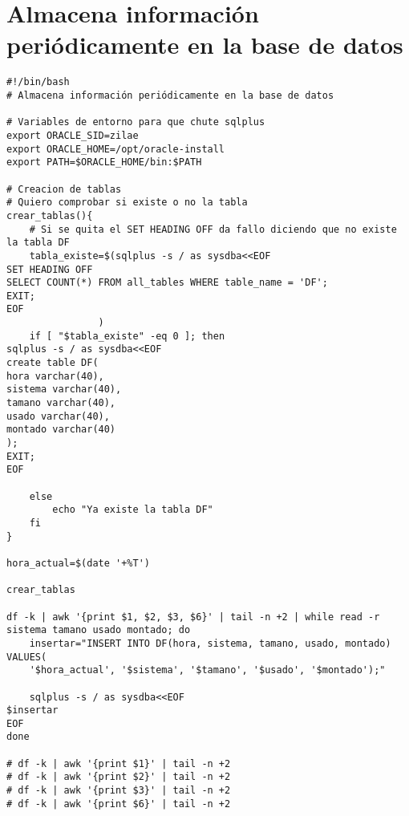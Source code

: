 \documentclass[11pt]{article}
\begin{document}
\section{Almacena información periódicamente en la base de datos}
\label{sec:org9d9271a}
\begin{verbatim}
#!/bin/bash
# Almacena información periódicamente en la base de datos

# Variables de entorno para que chute sqlplus
export ORACLE_SID=zilae
export ORACLE_HOME=/opt/oracle-install
export PATH=$ORACLE_HOME/bin:$PATH

# Creacion de tablas
# Quiero comprobar si existe o no la tabla
crear_tablas(){
    # Si se quita el SET HEADING OFF da fallo diciendo que no existe la tabla DF
    tabla_existe=$(sqlplus -s / as sysdba<<EOF
SET HEADING OFF
SELECT COUNT(*) FROM all_tables WHERE table_name = 'DF';
EXIT;
EOF
                )
    if [ "$tabla_existe" -eq 0 ]; then
sqlplus -s / as sysdba<<EOF
create table DF(
hora varchar(40),
sistema varchar(40),
tamano varchar(40),
usado varchar(40),
montado varchar(40)
);
EXIT;
EOF

    else
        echo "Ya existe la tabla DF"
    fi
}

hora_actual=$(date '+%T')

crear_tablas

df -k | awk '{print $1, $2, $3, $6}' | tail -n +2 | while read -r sistema tamano usado montado; do
    insertar="INSERT INTO DF(hora, sistema, tamano, usado, montado) VALUES(
    '$hora_actual', '$sistema', '$tamano', '$usado', '$montado');"

    sqlplus -s / as sysdba<<EOF
$insertar
EOF
done

# df -k | awk '{print $1}' | tail -n +2
# df -k | awk '{print $2}' | tail -n +2
# df -k | awk '{print $3}' | tail -n +2
# df -k | awk '{print $6}' | tail -n +2
\end{verbatim}
\end{document}
